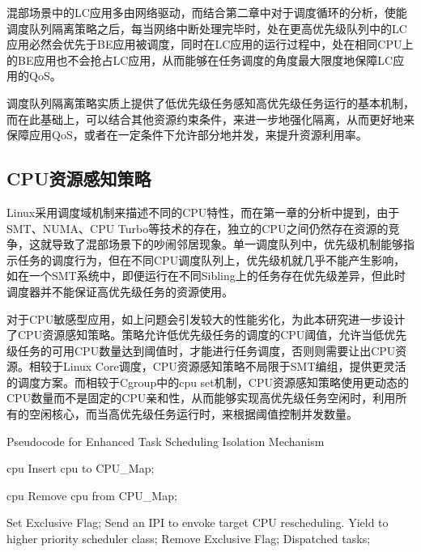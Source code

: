 混部场景中的LC应用多由网络驱动，而结合第二章中对于调度循环的分析，使能调度队列隔离策略之后，每当网络中断处理完毕时，处在更高优先级队列中的LC应用必然会优先于BE应用被调度，同时在LC应用的运行过程中，处在相同CPU上的BE应用也不会抢占LC应用，从而能够在任务调度的角度最大限度地保障LC应用的QoS。

调度队列隔离策略实质上提供了低优先级任务感知高优先级任务运行的基本机制，而在此基础上，可以结合其他资源约束条件，来进一步地强化隔离，从而更好地来保障应用QoS，或者在一定条件下允许部分地并发，来提升资源利用率。

\subsection{CPU资源感知策略}


Linux采用调度域机制来描述不同的CPU特性，而在第一章的分析中提到，由于SMT、NUMA、CPU Turbo等技术的存在，独立的CPU之间仍然存在资源的竞争，这就导致了混部场景下的吵闹邻居现象。单一调度队列中，优先级机制能够指示任务的调度行为，但在不同CPU调度队列上，优先级机就几乎不能产生影响，如在一个SMT系统中，即便运行在不同Sibling上的任务存在优先级差异，但此时调度器并不能保证高优先级任务的资源使用。

对于CPU敏感型应用，如上问题会引发较大的性能劣化，为此本研究进一步设计了CPU资源感知策略。策略允许低优先级任务的调度的CPU阈值，允许当低优先级任务的可用CPU数量达到阈值时，才能进行任务调度，否则则需要让出CPU资源。相较于Linux Core调度，CPU资源感知策略不局限于SMT编组，提供更灵活的调度方案。而相较于Cgroup中的cpu set机制，CPU资源感知策略使用更动态的CPU数量而不是固定的CPU亲和性，从而能够实现高优先级任务空闲时，利用所有的空闲核心，而当高优先级任务运行时，来根据阈值控制并发数量。

\begin{algorithm}
    \caption{Pseudocode for Enhanced Task Scheduling Isolation Mechanism}
    \label{alg:cpu_aware_sched}
    \begin{algorithmic}[1]
    
     {cpu}
    \State Insert cpu to CPU\_Map;
    \EndFunction
    
     {cpu}
    \State Remove cpu from CPU\_Map;
    \EndFunction
    
                \State Set Exclusive Flag;
                    \State Send an IPI to envoke target CPU rescheduling.
                \EndFor
                \State Yield to higher priority scheduler class;
            \EndIf
            \State Remove Exclusive Flag;
            \State Dispatched tasks;
        \EndWhile
    \EndFunction
    \end{algorithmic}
\end{algorithm}

